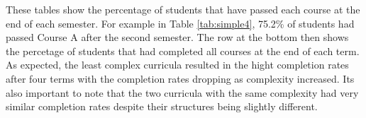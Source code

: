 \documentclass[botnum, fleqn]{unmeethesis}
\begin{document}
These tables show the percentage of students that have passed each course at the end of each semester. For example in Table \ref{tab:simple4}, 75.2\% of students had passed Course A after the second semester. The row at the bottom then shows the percetage of students that had completed all courses at the end of each term. As expected, the least complex curricula resulted in the hight completion rates after four terms with the completion rates dropping as complexity increased. Its also important to note that the two curricula with the same complexity had very similar completion rates despite their structures being slightly different.
\end{document}

